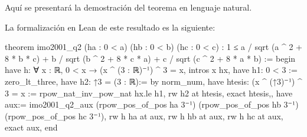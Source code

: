 \begin{demostracion}
  Aquí se presentará la demostración del teorema en lenguaje
  natural.
\end{demostracion}

La formalización en Lean de este resultado es la siguiente:

\begin{leancode}
theorem imo2001_q2 (ha : 0 < a) (hb : 0 < b) (hc : 0 < c) :
  1 ≤ a / sqrt (a ^ 2 + 8 * b * c) +
      b / sqrt (b ^ 2 + 8 * c * a) +
      c / sqrt (c ^ 2 + 8 * a * b) :=
begin
  have h: ∀ {x : ℝ}, 0 < x → (x ^ (3 : ℝ)⁻¹) ^ 3 = x,
  {intros x hx,
  have h1: 0 < 3 := zero_lt_three, 
  have h2: ↑3 = (3 : ℝ):= by norm_num,
  have htesis: (x ^ (↑3)⁻¹) ^ 3 = x := rpow_nat_inv_pow_nat hx.le h1,
  rw h2 at htesis,
  exact htesis,},
  have aux:= imo2001_q2_aux (rpow_pos_of_pos ha 3⁻¹) 
  (rpow_pos_of_pos hb 3⁻¹) (rpow_pos_of_pos hc 3⁻¹),
  rw h ha at aux,
  rw h hb at aux,
  rw h hc at aux,
  exact aux,
end
\end{leancode}